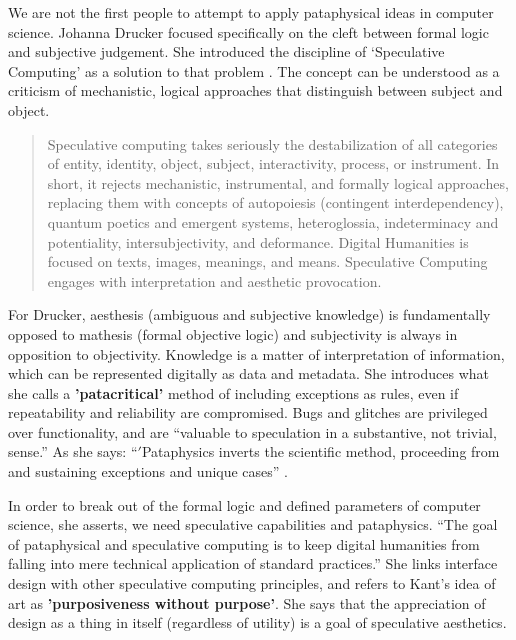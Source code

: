 We are not the first people to attempt to apply pataphysical ideas in computer science. Johanna Drucker focused specifically on the cleft between formal logic and subjective judgement. She introduced the discipline of `Speculative Computing' as a solution to that problem \autocite{Drucker2007}. The concept can be understood as a criticism of mechanistic, logical approaches that distinguish between subject and object.

\begin{quote}
  Speculative computing takes seriously the destabilization of all categories of entity, identity, object, subject, interactivity, process, or instrument. In short, it rejects mechanistic, instrumental, and formally logical approaches, replacing them with concepts of autopoiesis (contingent interdependency), quantum poetics and emergent systems, heteroglossia, indeterminacy and potentiality, intersubjectivity, and deformance. Digital Humanities is focused on texts, images, meanings, and means. Speculative Computing engages with interpretation and aesthetic provocation. \autocite[p.29]{Drucker2009}
\end{quote}

For Drucker, aesthesis (ambiguous and subjective knowledge) is fundamentally opposed to mathesis (formal objective logic) and subjectivity is always in opposition to objectivity. Knowledge is a matter of interpretation of information, which can be represented digitally as data and metadata. She introduces what she calls a \textbf{'patacritical'} method of including exceptions as rules, even if repeatability and reliability are compromised. Bugs and glitches are privileged over functionality, and are ``valuable to speculation in a substantive, not trivial, sense.'' As she says: ``$'$Pataphysics inverts the scientific method, proceeding from and sustaining exceptions and unique cases'' \autocite{Drucker2007}.

In order to break out of the formal logic and defined parameters of computer science, she asserts, we need speculative capabilities and pataphysics. ``The goal of pataphysical and speculative computing is to keep digital humanities from falling into mere technical application of standard practices.'' She links interface design with other speculative computing principles, and refers to Kant's idea of art as \textbf{'purposiveness without purpose'}. She says that the appreciation of design as a thing in itself (regardless of utility) is a goal of speculative aesthetics.

